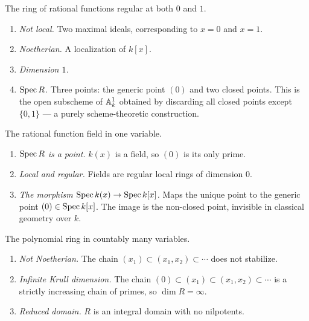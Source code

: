\documentclass[a4paper, 12pt]{article}
\begin{document}
\begin{example}[{$R = k[x]_{(x)} \cap k[x]_{(x-1)} \subseteq k(x)$, semilocalization at two points}]
The ring of rational functions regular at both $0$ and $1$.
\leavevmode\begin{enumerate}
\item \emph{Not local.} Two maximal ideals, corresponding to $x = 0$ and $x = 1$.
\item \emph{Noetherian.} A localization of $k[x]$.
\item \emph{Dimension $1$.}
\item \emph{$\Spec R$.} Three points: the generic point $(0)$ and two closed
  points. This is the open subscheme of $\AA^1_k$ obtained by discarding all
  closed points except $\{0, 1\}$ — a purely scheme-theoretic construction.
\end{enumerate}
\end{example}


\begin{example}[$R = k(x)$, the generic point]
The rational function field in one variable.
\leavevmode\begin{enumerate}
\item \emph{$\Spec R$ is a point.} $k(x)$ is a field, so $(0)$ is its only prime.
\item \emph{Local and regular.} Fields are regular local rings of dimension $0$.
\item \emph{The morphism $\Spec k(x) \to \Spec k[x]$.} Maps the unique point to
  the generic point $(0) \in \Spec k[x]$. The image is the non-closed point,
  invisible in classical geometry over $k$.
\end{enumerate}
\end{example}


\begin{example}[{$R = k[x_1, x_2, x_3, \ldots]$, infinite affine space}]
The polynomial ring in countably many variables.
\leavevmode\begin{enumerate}
\item \emph{Not Noetherian.} The chain $(x_1) \subset (x_1, x_2) \subset \cdots$
  does not stabilize.
\item \emph{Infinite Krull dimension.} The chain
  $(0) \subset (x_1) \subset (x_1,x_2) \subset \cdots$
  is a strictly increasing chain of primes, so $\dim R = \infty$.
\item \emph{Reduced domain.} $R$ is an integral domain with no nilpotents.
\end{enumerate}
\end{example}
\end{document}

